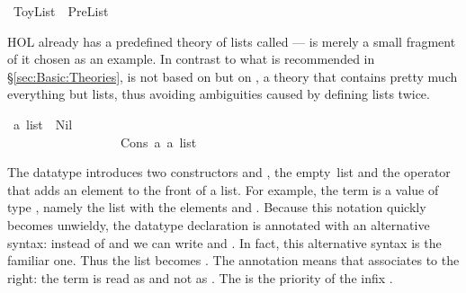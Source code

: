 %
\begin{isabellebody}%
\def\isabellecontext{ToyList}%
\ ToyList\ {\isacharequal}\ PreList{\isacharcolon}\isamarkupfalse%
%
\begin{isamarkuptext}%
\noindent
HOL already has a predefined theory of lists called  ---
 is merely a small fragment of it chosen as an example. In
contrast to what is recommended in \S\ref{sec:Basic:Theories},
 is not based on  but on , a
theory that contains pretty much everything but lists, thus avoiding
ambiguities caused by defining lists twice.%
\end{isamarkuptext}%
\isamarkuptrue%
\ {\isacharprime}a\ list\ {\isacharequal}\ Nil\ \ \ \ \ \ \ \ \ \ \ \ \ \ \ \ \ \ \ \ \ \ \ \ \ \ {\isacharparenleft}{\isachardoublequote}{\isacharbrackleft}{\isacharbrackright}{\isachardoublequote}{\isacharparenright}\isanewline
\ \ \ \ \ \ \ \ \ \ \ \ \ \ \ \ \ {\isacharbar}\ Cons\ {\isacharprime}a\ {\isachardoublequote}{\isacharprime}a\ list{\isachardoublequote}\ \ \ \ \ \ \ \ \ \ \ \ {\isacharparenleft}\ {\isachardoublequote}{\isacharhash}{\isachardoublequote}\ {}{}{\isacharparenright}\isamarkupfalse%
%
\begin{isamarkuptext}%
\noindent
The datatype
 introduces two
constructors  and , the
empty~list and the operator that adds an element to the front of a list. For
example, the term  is a value of
type , namely the list with the elements  and
. Because this notation quickly becomes unwieldy, the
datatype declaration is annotated with an alternative syntax: instead of
 and  we can write
\isa{{\isacharbrackleft}{\isacharbrackright}} and
. In fact, this
alternative syntax is the familiar one.  Thus the list  becomes . The annotation
means that \isa{{\isacharhash}} associates to
the right: the term  is read as 
and not as .
The  is the priority of the infix \isa{{\isacharhash}}.


\end{isamarkuptext}
\end{isabellebody}
